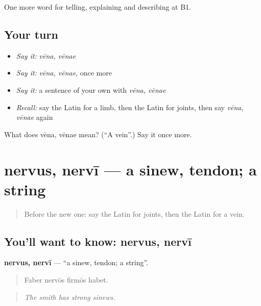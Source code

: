 \begin{grammarlens}[title={What you've built}]
One more word for telling, explaining and describing at B1.
\end{grammarlens}

\subsection*{Your turn}
\begin{itemize}
\raggedright
  \item \emph{Say it:} \emph{vēna, vēnae}
  \item \emph{Say it:} \emph{vēna, vēnae}, once more
  \item \emph{Say it:} a sentence of your own with \emph{vēna, vēnae}
  \item \emph{Recall:} say the Latin for a limb, then the Latin for joints, then say \emph{vēna, vēnae} again
\end{itemize}

\begin{tcolorbox}[breakable,colback=teal!4,colframe=teal!35!black,title={Before you move on}]
What does vēna, vēnae mean? (\textquotedblleft{}A vein\textquotedblright{}.) Say it once more.
\end{tcolorbox}
\section[nervus, nervī]{nervus, nervī — a sinew, tendon; a string}

\label{lesson:LA-C517-nervus}



\begin{quote}
Before the new one: say the Latin for joints, then the Latin for a vein.
\end{quote}

\subsection*{You'll want to know: nervus, nervī}
\textbf{nervus, nervī} — \textquotedblleft{}a sinew, tendon; a string\textquotedblright{}.

\begin{quote}
Faber nervōs firmōs habet.
\end{quote}

\begin{quote}
\emph{The smith has strong sinews.}
\end{quote}

